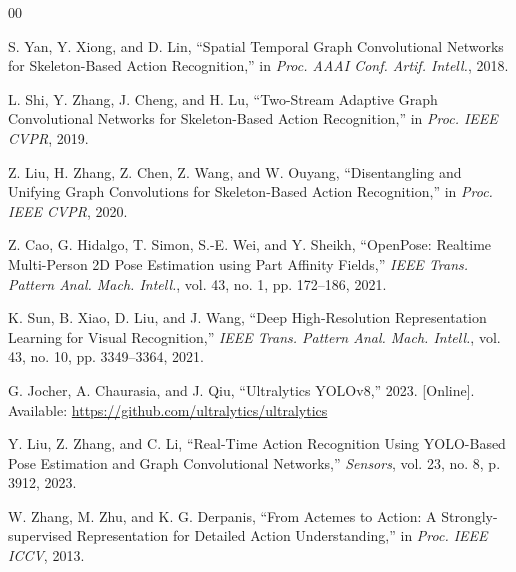 \documentclass[conference]{IEEEtran}
\begin{document}
\begin{thebibliography}{00}

S. Yan, Y. Xiong, and D. Lin,
``Spatial Temporal Graph Convolutional Networks for Skeleton-Based Action Recognition,''
in \textit{Proc. AAAI Conf. Artif. Intell.}, 2018.

L. Shi, Y. Zhang, J. Cheng, and H. Lu,
``Two-Stream Adaptive Graph Convolutional Networks for Skeleton-Based Action Recognition,''
in \textit{Proc. IEEE CVPR}, 2019.

Z. Liu, H. Zhang, Z. Chen, Z. Wang, and W. Ouyang,
``Disentangling and Unifying Graph Convolutions for Skeleton-Based Action Recognition,''
in \textit{Proc. IEEE CVPR}, 2020.

Z. Cao, G. Hidalgo, T. Simon, S.-E. Wei, and Y. Sheikh,
``OpenPose: Realtime Multi-Person 2D Pose Estimation using Part Affinity Fields,''
\textit{IEEE Trans. Pattern Anal. Mach. Intell.}, vol. 43, no. 1, pp. 172--186, 2021.

K. Sun, B. Xiao, D. Liu, and J. Wang,
``Deep High-Resolution Representation Learning for Visual Recognition,''
\textit{IEEE Trans. Pattern Anal. Mach. Intell.}, vol. 43, no. 10, pp. 3349--3364, 2021.

G. Jocher, A. Chaurasia, and J. Qiu,
``Ultralytics YOLOv8,'' 2023. [Online].
Available: \url{https://github.com/ultralytics/ultralytics}

Y. Liu, Z. Zhang, and C. Li,
``Real-Time Action Recognition Using YOLO-Based Pose Estimation and Graph Convolutional Networks,''
\textit{Sensors}, vol. 23, no. 8, p. 3912, 2023.

W. Zhang, M. Zhu, and K. G. Derpanis,
``From Actemes to Action: A Strongly-supervised Representation for Detailed Action Understanding,''
in \textit{Proc. IEEE ICCV}, 2013.

\end{thebibliography}
\end{document}
